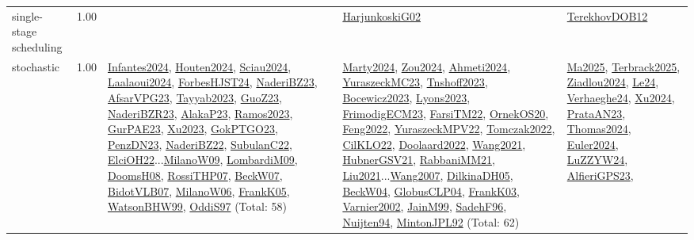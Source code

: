 {\begin{longtable}{p{3cm}r>{\raggedright\arraybackslash}p{6cm}>{\raggedright\arraybackslash}p{6cm}>{\raggedright\arraybackslash}p{8cm}}
\index{single-stage scheduling}\index{Concepts!single-stage scheduling}single-stage scheduling &  1.00 &  & \hyperref[detail:HarjunkoskiG02]{HarjunkoskiG02} & \hyperref[detail:TerekhovDOB12]{TerekhovDOB12}\\
\index{stochastic}\index{Concepts!stochastic}stochastic &  1.00 & \hyperref[detail:Infantes2024]{Infantes2024}, \hyperref[detail:Houten2024]{Houten2024}, \hyperref[detail:Sciau2024]{Sciau2024}, \hyperref[detail:Laalaoui2024]{Laalaoui2024}, \hyperref[detail:ForbesHJST24]{ForbesHJST24}, \hyperref[detail:NaderiBZ23]{NaderiBZ23}, \hyperref[detail:AfsarVPG23]{AfsarVPG23}, \hyperref[detail:Tayyab2023]{Tayyab2023}, \hyperref[detail:GuoZ23]{GuoZ23}, \hyperref[detail:NaderiBZR23]{NaderiBZR23}, \hyperref[detail:AlakaP23]{AlakaP23}, \hyperref[detail:Ramos2023]{Ramos2023}, \hyperref[detail:GurPAE23]{GurPAE23}, \hyperref[detail:Xu2023]{Xu2023}, \hyperref[detail:GokPTGO23]{GokPTGO23}, \hyperref[detail:PenzDN23]{PenzDN23}, \hyperref[detail:NaderiBZ22]{NaderiBZ22}, \hyperref[detail:SubulanC22]{SubulanC22}, \hyperref[detail:ElciOH22]{ElciOH22}...\hyperref[detail:MilanoW09]{MilanoW09}, \hyperref[detail:LombardiM09]{LombardiM09}, \hyperref[detail:DoomsH08]{DoomsH08}, \hyperref[detail:RossiTHP07]{RossiTHP07}, \hyperref[detail:BeckW07]{BeckW07}, \hyperref[detail:BidotVLB07]{BidotVLB07}, \hyperref[detail:MilanoW06]{MilanoW06}, \hyperref[detail:FrankK05]{FrankK05}, \hyperref[detail:WatsonBHW99]{WatsonBHW99}, \hyperref[detail:OddiS97]{OddiS97} (Total: 58) & \hyperref[detail:Marty2024]{Marty2024}, \hyperref[detail:Zou2024]{Zou2024}, \hyperref[detail:Ahmeti2024]{Ahmeti2024}, \hyperref[detail:YuraszeckMC23]{YuraszeckMC23}, \hyperref[detail:Tnshoff2023]{Tnshoff2023}, \hyperref[detail:Bocewicz2023]{Bocewicz2023}, \hyperref[detail:Lyons2023]{Lyons2023}, \hyperref[detail:FrimodigECM23]{FrimodigECM23}, \hyperref[detail:FarsiTM22]{FarsiTM22}, \hyperref[detail:OrnekOS20]{OrnekOS20}, \hyperref[detail:Feng2022]{Feng2022}, \hyperref[detail:YuraszeckMPV22]{YuraszeckMPV22}, \hyperref[detail:Tomczak2022]{Tomczak2022}, \hyperref[detail:CilKLO22]{CilKLO22}, \hyperref[detail:Doolaard2022]{Doolaard2022}, \hyperref[detail:Wang2021]{Wang2021}, \hyperref[detail:HubnerGSV21]{HubnerGSV21}, \hyperref[detail:RabbaniMM21]{RabbaniMM21}, \hyperref[detail:Liu2021]{Liu2021}...\hyperref[detail:Wang2007]{Wang2007}, \hyperref[detail:DilkinaDH05]{DilkinaDH05}, \hyperref[detail:BeckW04]{BeckW04}, \hyperref[detail:GlobusCLP04]{GlobusCLP04}, \hyperref[detail:FrankK03]{FrankK03}, \hyperref[detail:Varnier2002]{Varnier2002}, \hyperref[detail:JainM99]{JainM99}, \hyperref[detail:SadehF96]{SadehF96}, \hyperref[detail:Nuijten94]{Nuijten94}, \hyperref[detail:MintonJPL92]{MintonJPL92} (Total: 62) & \hyperref[detail:Ma2025]{Ma2025}, \hyperref[detail:Terbrack2025]{Terbrack2025}, \hyperref[detail:Ziadlou2024]{Ziadlou2024}, \hyperref[detail:Le24]{Le24}, \hyperref[detail:Verhaeghe24]{Verhaeghe24}, \hyperref[detail:Xu2024]{Xu2024}, \hyperref[detail:PrataAN23]{PrataAN23}, \hyperref[detail:Thomas2024]{Thomas2024}, \hyperref[detail:Euler2024]{Euler2024}, \hyperref[detail:LuZZYW24]{LuZZYW24}, \hyperref[detail:AlfieriGPS23]{AlfieriGPS23}, 
\end{longtable}}
